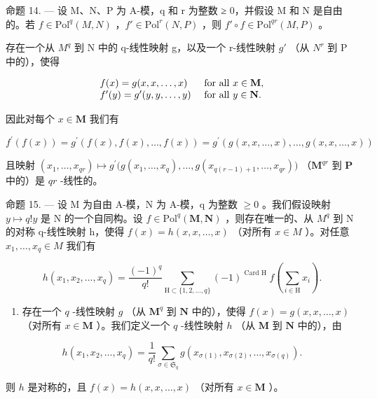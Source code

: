命题 14. --- 设 M、N、P 为 A-模，q 和 r 为整数 ≥ 0，并假设 M 和 N 是自由的。若 \(f \in \text{Pol}^{q}(M, N)\) ，\(f' \in \text{Pol}^{r}(N, P)\) ，则 \(f' \circ f \in \text{Pol}^{qr}(M, P)\) 。

存在一个从 \(M^{q}\) 到 N 中的 q-线性映射 g，以及一个 r-线性映射 \(g'\) （从 \(N^{r}\) 到 P 中的），使得

\[
\begin{array}{l l} f (x) = g (x, x, \dots , x) & \text { for   all } x \in \mathbf {M}, \\ f ^ {\prime} (y) = g ^ {\prime} (y, y, \dots , y) & \text { for   all } y \in \mathbf {N}. \end{array}
\]

因此对每个 \(x \in \mathbf{M}\) 我们有

\[
f ^ {\prime} (f (x)) = g ^ {\prime} (f (x), f (x), \dots , f (x)) = g ^ {\prime} (g (x, x, \dots , x), \dots , g (x, x, \dots , x))
\]

且映射 \((x_{1},\ldots ,x_{qr})\mapsto g^{\prime}\big(g(x_{1},\dots,x_{q}),\dots,g(x_{q(r - 1) + 1},\dots,x_{qr})\big)\) （\(\mathbf{M}^{qr}\) 到 \(\mathbf{P}\) 中的）是 \(qr\) -线性的。

命题 15. --- 设 M 为自由 A-模，N 为 A-模，q 为整数 \(\geqslant0\) 。我们假设映射 \(y\mapsto q!y\) 是 N 的一个自同构。设 \(f\in\mathrm{Pol}^{q}(\mathbf{M},\mathbf{N})\) ，则存在唯一的、从 \(M^{q}\) 到 N 的对称 q-线性映射 h，使得 \(f(x)=h(x,x,\ldots,x)\) （对所有 \(x\in M\) ）。对任意 \(x_{1},\ldots,x_{q}\in M\) 我们有

\[
h \left(x _ {1}, x _ {2}, \dots , x _ {q}\right) = \frac {(- 1) ^ {q}}{q !} \sum_ {\mathrm{H} \subset \{1, 2, \dots , q \}} (- 1) ^ {\text { Card   H }} f \left(\sum_ {i \in \mathrm{H}} x _ {i}\right).\tag{16}
\]

\begin{enumerate}
\def\labelenumi{\alph{enumi})}
\tightlist
\item
  存在一个 \(q\) -线性映射 \(g\) （从 \(\mathbf{M}^q\) 到 \(\mathbf{N}\) 中的），使得 \(f(x) = g(x, x, \ldots, x)\) （对所有 \(x \in \mathbf{M}\) ）。我们定义一个 \(q\) -线性映射 \(h\) （从 \(\mathbf{M}\) 到 \(\mathbf{N}\) 中的），由
\end{enumerate}

\[
h \left(x _ {1}, x _ {2}, \dots , x _ {q}\right) = \frac {1}{q !} \sum_ {\sigma \in \mathfrak {S} _ {q}} g \left(x _ {\sigma (1)}, x _ {\sigma (2)}, \dots , x _ {\sigma (q)}\right).
\]

则 \(h\) 是对称的，且 \(f(x) = h(x, x, \ldots, x)\) （对所有 \(x \in \mathbf{M}\) ）。

